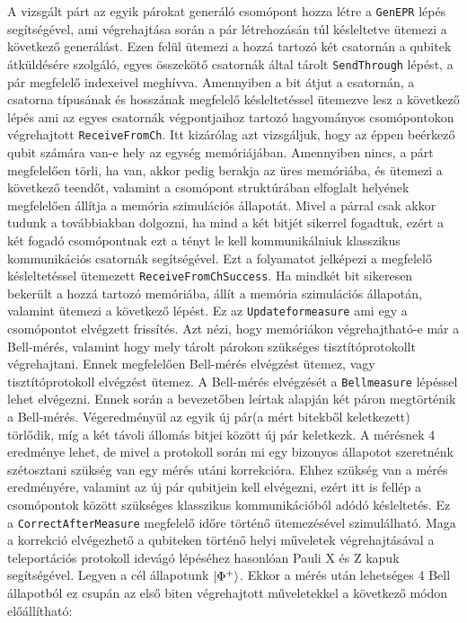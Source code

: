 A vizsgált párt az egyik párokat generáló csomópont hozza létre a \texttt{GenEPR} lépés segítségével, ami végrehajtása során a pár létrehozásán túl késleltetve ütemezi a következő generálást. Ezen felül ütemezi a hozzá tartozó két csatornán a qubitek átküldésére szolgáló, egyes összekötő csatornák által tárolt \texttt{SendThrough} lépést, a pár megfelelő indexeivel meghívva. Amennyiben a bit átjut a csatornán, a csatorna típusának és hosszának megfelelő késleltetéssel ütemezve lesz a következő lépés ami az egyes csatornák végpontjaihoz tartozó hagyományos csomópontokon végrehajtott \texttt{ReceiveFromCh}. Itt kizárólag azt vizsgáljuk, hogy az éppen beérkező qubit számára van-e hely az egység memóriájában. Amennyiben nincs, a párt megfelelően törli, ha van, akkor pedig berakja az üres memóriába, és ütemezi a következő teendőt, valamint a csomópont struktúrában elfoglalt helyének megfelelően állítja a memória szimulációs állapotát.  Mivel a párral csak akkor tudunk a továbbiakban dolgozni, ha mind a két bitjét sikerrel fogadtuk, ezért a két fogadó csomópontnak ezt a tényt le kell kommunikálniuk klasszikus kommunikációs csatornák segítségével. Ezt a folyamatot jelképezi a megfelelő késleltetéssel ütemezett \texttt{ReceiveFromChSuccess}. Ha mindkét bit sikeresen bekerült a hozzá tartozó memóriába, állít a memória szimulációs állapotán, valamint ütemezi a következő lépést. Ez az \texttt{Updateformeasure} ami egy a csomópontot elvégzett frissítés. Azt nézi, hogy memóriákon végrehajtható-e már a Bell-mérés, valamint hogy mely tárolt párokon szükséges tisztítóprotokollt végrehajtani.
Ennek megfelelően Bell-mérés elvégzést ütemez, vagy tisztítóprotokoll elvégzést ütemez. A Bell-mérés elvégzését a \texttt{Bellmeasure} lépéssel lehet elvégezni. Ennek során a bevezetőben leírtak alapján két páron megtörténik a Bell-mérés. Végeredményül az egyik új pár(a mért bitekből keletkezett) törlődik, míg a két távoli állomás bitjei között új pár keletkezk. A mérésnek 4 eredménye lehet, de mivel a protokoll során mi egy bizonyos állapotot szeretnénk szétosztani szükség van egy mérés utáni korrekcióra. Ehhez szükség van a mérés eredményére, valamint az új pár qubitjein kell elvégezni, ezért itt is fellép a csomópontok között szükséges klasszikus kommunikációból adódó késleltetés. Ez a \texttt{CorrectAfterMeasure} megfelelő időre történő ütemezésével szimulálható. Maga a korrekció elvégezhető a qubiteken történő helyi műveletek végrehajtásával a teleportációs protokoll \cite{bennett1993teleporting} idevágó lépéséhez hasonlóan  Pauli X és Z kapuk segítségével. Legyen a cél állapotunk $\ket{\Phi^+}$. Ekkor a mérés után lehetséges 4 Bell állapotból ez csupán az első biten végrehajtott műveletekkel a következő módon előállítható:
